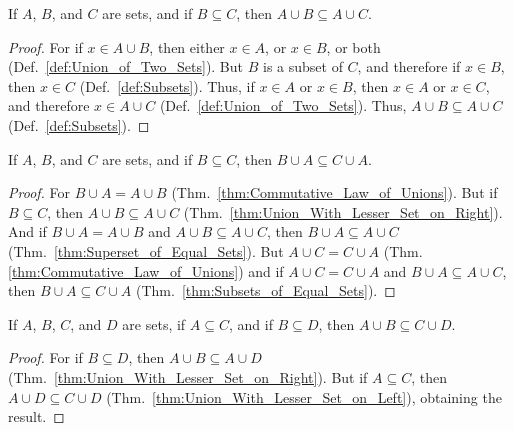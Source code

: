         \begin{theorem}
            \label{thm:Union_With_Lesser_Set_on_Right}%
            If $A$, $B$, and $C$ are sets, and if $B\subseteq{C}$, then
            $A\cup{B}\subseteq{A}\cup{C}$.
        \end{theorem}
        \begin{proof}
            For if $x\in{A}\cup{B}$, then either $x\in{A}$, or $x\in{B}$, or
            both (Def.~\ref{def:Union_of_Two_Sets}). But $B$ is a subset of $C$,
            and therefore if $x\in{B}$, then $x\in{C}$ (Def.~\ref{def:Subsets}).
            Thus, if $x\in{A}$ or $x\in{B}$, then $x\in{A}$ or $x\in{C}$, and
            therefore $x\in{A}\cup{C}$ (Def.~\ref{def:Union_of_Two_Sets}).
            Thus, $A\cup{B}\subseteq{A}\cup{C}$ (Def.~\ref{def:Subsets}).
        \end{proof}
        \begin{theorem}
            \label{thm:Union_With_Lesser_Set_on_Left}%
            If $A$, $B$, and $C$ are sets, and if $B\subseteq{C}$, then
            $B\cup{A}\subseteq{C}\cup{A}$.
        \end{theorem}
        \begin{proof}
            For $B\cup{A}=A\cup{B}$ (Thm.~\ref{thm:Commutative_Law_of_Unions}).
            But if $B\subseteq{C}$, then $A\cup{B}\subseteq{A}\cup{C}$
            (Thm.~\ref{thm:Union_With_Lesser_Set_on_Right}). And if
            $B\cup{A}=A\cup{B}$ and $A\cup{B}\subseteq{A}\cup{C}$, then
            $B\cup{A}\subseteq{A}\cup{C}$
            (Thm.~\ref{thm:Superset_of_Equal_Sets}). But $A\cup{C}=C\cup{A}$
            (Thm.\ref{thm:Commutative_Law_of_Unions}) and if $A\cup{C}=C\cup{A}$
            and $B\cup{A}\subseteq{A}\cup{C}$, then
            $B\cup{A}\subseteq{C}\cup{A}$
            (Thm.~\ref{thm:Subsets_of_Equal_Sets}).
        \end{proof}
        \begin{theorem}
            If $A$, $B$, $C$, and $D$ are sets, if $A\subseteq{C}$, and if
            $B\subseteq{D}$, then $A\cup{B}\subseteq{C}\cup{D}$.
        \end{theorem}
        \begin{proof}
            For if $B\subseteq{D}$, then $A\cup{B}\subseteq{A}\cup{D}$
            (Thm.~\ref{thm:Union_With_Lesser_Set_on_Right}). But if
            $A\subseteq{C}$, then $A\cup{D}\subseteq{C}\cup{D}$
            (Thm.~\ref{thm:Union_With_Lesser_Set_on_Left}), obtaining the
            result.
        \end{proof}
